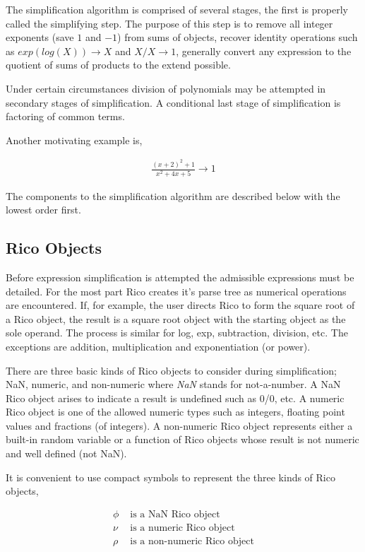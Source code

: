 The simplification algorithm is comprised of several stages, the first is properly called the simplifying step. The purpose of this step is to remove all integer exponents (save $1$ and $-1$) from sums of objects, recover identity operations such as $exp(log(X)) \rightarrow X$ and $X/X \rightarrow 1$, generally convert any expression to the quotient of sums of products to the extend possible. 

Under certain circumstances division of polynomials may be attempted in secondary stages of simplification. A conditional last stage of simplification is factoring of common terms.

Another motivating example is,

\begin{align*}
\frac{(x+2)^2 +1}{x^2 + 4x + 5} \rightarrow 1
\end{align*}

The components to the simplification algorithm are described below with the lowest order first.

\subsection{Rico Objects}

Before expression simplification is attempted the admissible expressions must be detailed. For the most part Rico creates it's parse tree as numerical operations are encountered. If, for example, the user directs Rico to form the square root of a Rico object, the result is a square root object with the starting object as the sole operand. The process is similar for log, exp, subtraction, division, etc. The exceptions are addition, multiplication and exponentiation (or power).

There are three basic kinds of Rico objects to consider during simplification; NaN, numeric, and non-numeric where \emph{NaN} stands for not-a-number. A NaN Rico object arises to indicate a result is undefined such as 0/0, etc. A numeric Rico object is one of the allowed numeric types such as integers, floating point values and fractions (of integers). A non-numeric Rico object represents either a built-in random variable or a function of Rico objects whose result is not numeric and well defined (not NaN). 

It is convenient to use compact symbols to represent the three kinds of Rico objects,

\begin{align*}
\phi &\text{ is a NaN Rico object}\\
\nu  &\text{ is a numeric Rico object}\\
\rho &\text{ is a non-numeric Rico object}
\end{align*}

